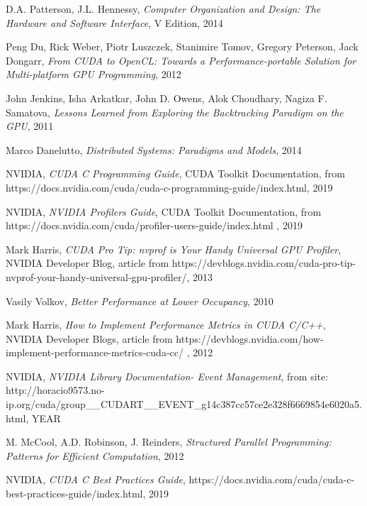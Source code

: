 \documentclass[12pt]{report}
\begin{document}
	\begin{thebibliography}{9}
		D.A. Patterson, J.L. Hennessy, 
		\textit{Computer Organization and Design: The Hardware and Software Interface}, V Edition, 2014
	
		Peng Du, Rick Weber, Piotr Luszczek, Stanimire Tomov, Gregory Peterson, Jack Dongarr, 
		\textit{From CUDA to OpenCL: Towards a Performance-portable Solution for Multi-platform GPU Programming}, 2012
		
		John Jenkins, Isha Arkatkar, John D. Owens, Alok Choudhary, Nagiza F. Samatova, 
		\textit{Lessons Learned from Exploring the Backtracking Paradigm on the GPU}, 2011
		
		
		Marco Danelutto,
		\textit{Distributed Systems: Paradigms and Models}, 2014
		
		NVIDIA, \textit{CUDA C Programming Guide}, CUDA Toolkit Documentation, from https://docs.nvidia.com/cuda/cuda-c-programming-guide/index.html, 2019
		
		NVIDIA, \textit{NVIDIA Profilers Guide}, CUDA Toolkit Documentation, from
		https://docs.nvidia.com/cuda/profiler-users-guide/index.html , 2019 
		
		Mark Harris, 
		\textit{CUDA Pro Tip: nvprof is Your Handy Universal GPU Profiler}, NVIDIA Developer Blog, article from https://devblogs.nvidia.com/cuda-pro-tip-nvprof-your-handy-universal-gpu-profiler/, 2013
		
		Vasily Volkov,
		\textit{Better Performance at Lower Occupancy}, 2010
		
		Mark Harris, \textit{How to Implement Performance Metrics in CUDA C/C++}, NVIDIA Developer Blogs, article from https://devblogs.nvidia.com/how-implement-performance-metrics-cuda-cc/ , 2012 
		
		NVIDIA, \textit{NVIDIA Library Documentation- Event Management}, from site: http://horacio9573.no-ip.org/cuda/group\_\_CUDART\_\_EVENT\_g14c387cc57ce2e328f6669854e6020a5.html, YEAR
		
		M. McCool, A.D. Robinson, J. Reinders, \textit{Structured Parallel Programming: Patterns for Efficient Computation}, 2012
		
		NVIDIA, \textit{CUDA C Best Practices Guide}, https://docs.nvidia.com/cuda/cuda-c-best-practices-guide/index.html, 2019
	\end{thebibliography}

\end{document}
